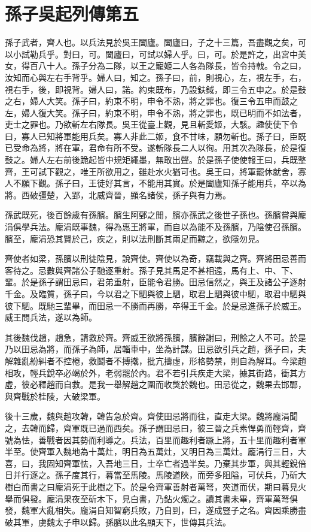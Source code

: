 \chapter{孫子吳起列傳第五}

孫子武者，齊人也。以兵法見於吳王闔廬。闔廬曰，子之十三篇，吾盡觀之矣，可以小試勒兵乎。對曰，可。闔廬曰，可試以婦人乎。曰，可。於是許之，出宮中美女，得百八十人。孫子分為二隊，以王之寵姬二人各為隊長，皆令持戟。令之曰，汝知而心與左右手背乎。婦人曰，知之。孫子曰，前，則視心，左，視左手，右，視右手，後，即視背。婦人曰，諾。約束既布，乃設鈇鉞，即三令五申之。於是鼓之右，婦人大笑。孫子曰，約束不明，申令不熟，將之罪也。復三令五申而鼓之左，婦人復大笑。孫子曰，約束不明，申令不熟，將之罪也，既已明而不如法者，吏士之罪也。乃欲斬左右隊長。吳王從臺上觀，見且斬愛姬，大駭。趣使使下令曰，寡人已知將軍能用兵矣。寡人非此二姬，食不甘味，願勿斬也。孫子曰，臣既已受命為將，將在軍，君命有所不受。遂斬隊長二人以徇。用其次為隊長，於是復鼓之。婦人左右前後跪起皆中規矩繩墨，無敢出聲。於是孫子使使報王曰，兵既整齊，王可試下觀之，唯王所欲用之，雖赴水火猶可也。吳王曰，將軍罷休就舍，寡人不願下觀。孫子曰，王徒好其言，不能用其實。於是闔廬知孫子能用兵，卒以為將。西破彊楚，入郢，北威齊晉，顯名諸侯，孫子與有力焉。

孫武既死，後百餘歲有孫臏。臏生阿鄄之閒，臏亦孫武之後世子孫也。孫臏嘗與龐涓俱學兵法。龐涓既事魏，得為惠王將軍，而自以為能不及孫臏，乃陰使召孫臏。臏至，龐涓恐其賢於己，疾之，則以法刑斷其兩足而黥之，欲隱勿見。

齊使者如梁，孫臏以刑徒陰見，說齊使。齊使以為奇，竊載與之齊。齊將田忌善而客待之。忌數與齊諸公子馳逐重射。孫子見其馬足不甚相遠，馬有上、中、下、輩。於是孫子謂田忌曰，君弟重射，臣能令君勝。田忌信然之，與王及諸公子逐射千金。及臨質，孫子曰，今以君之下駟與彼上駟，取君上駟與彼中駟，取君中駟與彼下駟。既馳三輩畢，而田忌一不勝而再勝，卒得王千金。於是忌進孫子於威王。威王問兵法，遂以為師。

其後魏伐趙，趙急，請救於齊。齊威王欲將孫臏，臏辭謝曰，刑餘之人不可。於是乃以田忌為將，而孫子為師，居輜車中，坐為計謀。田忌欲引兵之趙，孫子曰，夫解雜亂紛糾者不控棬，救鬬者不搏撠，批亢擣虛，形格勢禁，則自為解耳。今梁趙相攻，輕兵銳卒必竭於外，老弱罷於內。君不若引兵疾走大梁，據其街路，衝其方虛，彼必釋趙而自救。是我一舉解趙之圍而收獘於魏也。田忌從之，魏果去邯鄲，與齊戰於桂陵，大破梁軍。

後十三歲，魏與趙攻韓，韓告急於齊。齊使田忌將而往，直走大梁。魏將龐涓聞之，去韓而歸，齊軍既已過而西矣。孫子謂田忌曰，彼三晉之兵素悍勇而輕齊，齊號為怯，善戰者因其勢而利導之。兵法，百里而趣利者蹶上將，五十里而趣利者軍半至。使齊軍入魏地為十萬灶，明日為五萬灶，又明日為三萬灶。龐涓行三日，大喜，曰，我固知齊軍怯，入吾地三日，士卒亡者過半矣。乃棄其步軍，與其輕銳倍日并行逐之。孫子度其行，暮當至馬陵。馬陵道陜，而旁多阻隘，可伏兵，乃斫大樹白而書之曰龐涓死于此樹之下。於是令齊軍善射者萬弩，夾道而伏，期曰暮見火舉而俱發。龐涓果夜至斫木下，見白書，乃鉆火燭之。讀其書未畢，齊軍萬弩俱發，魏軍大亂相失。龐涓自知智窮兵敗，乃自剄，曰，遂成豎子之名。齊因乘勝盡破其軍，虜魏太子申以歸。孫臏以此名顯天下，世傳其兵法。

